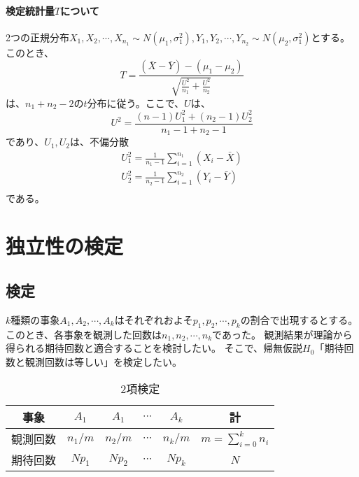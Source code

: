 \paragraph{検定統計量$T$について}
2つの正規分布$X_1,X_2,\cdots,X_{n_1} \sim N(\mu_1,\sigma_1^2), Y_1,Y_2,\cdots,Y_{n_2}\sim N(\mu_2,\sigma_1^2)$とする。このとき、
\begin{equation*}
    T = \frac{(\bar{X}-\bar{Y})-(\mu_1-\mu_2)}{\sqrt{\frac{U^2}{n_1}+\frac{U^2}{n_2}}}
\end{equation*}
は、$n_1+n_2-2$の$t$分布に従う。ここで、$U$は、
\begin{equation*}
    U^2 = \frac{(n-1)U_1^2+(n_2-1)U_2^2}{n_1-1+n_2-1}
\end{equation*}
であり、$U_1,U_2$は、不偏分散
\begin{eqnarray*}
    U_1^2 = \frac{1}{n_1-1}\sum_{i=1}^{n_1}(X_i-\bar{X})\\
    U_2^2 = \frac{1}{n_2-1}\sum_{i=1}^{n_2}(Y_i-\bar{Y})\\
\end{eqnarray*}
である。


\section{独立性の検定}

\subsection{検定}
$k$種類の事象$A_1,A_2,\cdots,A_k$はそれぞれおよそ$p_1,p_2,\cdots,p_k$の割合で出現するとする。このとき、各事象を観測した回数は$n_1,n_2,\cdots,n_k$であった。
観測結果が理論から得られる期待回数と適合することを検討したい。
そこで、帰無仮説$H_0$「期待回数と観測回数は等しい」を検定したい。

\fi

\begin{table}[hbtp]
 \caption{2項検定}
 \label{table:binomial_test}
 \centering
 \begin{tabular}{c|cccc|c}
  事象 & $A_1$ & $A_1$ & $\cdots$ & $A_k$ & 計 \\    \hline \hline
  観測回数 & $n_1/m$ & $n_2/m$ & $\cdots$ & $n_k/m$ &  $m=\sum_{i=0}^{k} n_i $ \\
  期待回数 & $N p_1$ & $N p_2$ & $\cdots$ & $N p_k$ &  $N$ 
 \end{tabular}
\end{table}


